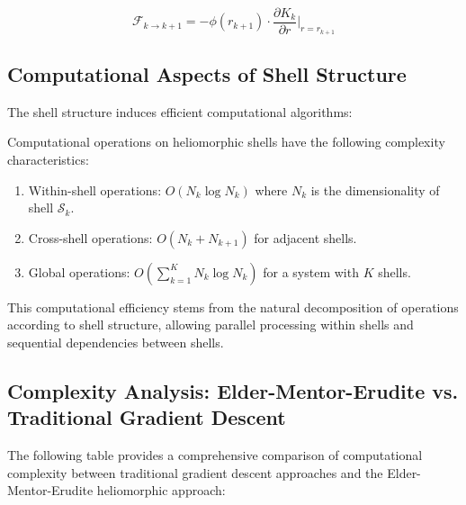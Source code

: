\begin{equation}
\mathcal{F}_{k \to k+1} = -\phi(r_{k+1}) \cdot \frac{\partial K_k}{\partial r}\bigg|_{r=r_{k+1}}
\end{equation}

\subsection{Computational Aspects of Shell Structure}

The shell structure induces efficient computational algorithms:

\begin{theorem}
Computational operations on heliomorphic shells have the following complexity characteristics:
\begin{enumerate}
    \item Within-shell operations: $O(N_k \log N_k)$ where $N_k$ is the dimensionality of shell $\mathcal{S}_k$.
    \item Cross-shell operations: $O(N_k + N_{k+1})$ for adjacent shells.
    \item Global operations: $O(\sum_{k=1}^{K} N_k \log N_k)$ for a system with $K$ shells.
\end{enumerate}
\end{theorem}

This computational efficiency stems from the natural decomposition of operations according to shell structure, allowing parallel processing within shells and sequential dependencies between shells.

\subsection{Complexity Analysis: Elder-Mentor-Erudite vs. Traditional Gradient Descent}

The following table provides a comprehensive comparison of computational complexity between traditional gradient descent approaches and the Elder-Mentor-Erudite heliomorphic approach:

